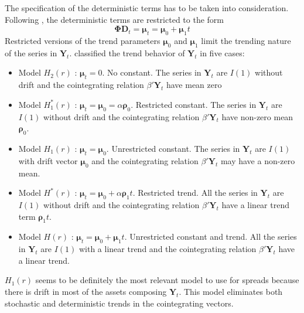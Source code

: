 \documentclass[11pt,a4,twosided,singlespacing,titlepagenumber=on]{scrreprt}
\numberwithin{equation}{chapter} %
\theoremstyle{remark}
\newcommand{\matr}[1]{\mathbf{#1}}
\begin{document}
The specification of the deterministic terms has to be taken into consideration. Following \cite{johansen1995}, the deterministic terms are restricted to the form
\begin{equation}
\matr{\Phi} \matr{D}_t = \matr{\mu}_t = \matr{\mu}_0 + \matr{\mu}_1 t
\end{equation}
Restricted versions of the trend parameters $\matr{\mu}_0$ and $\matr{\mu}_1$ limit the trending nature of the series in $\matr{Y}_t$. \cite{johansen1995} classified the trend behavior of $\matr{Y}_t$ in five cases:
\begin{itemize}
\item Model $H_2(r)$ : $\matr{\mu}_t = 0$. No constant. The series in $\matr{Y}_t$ are $I(1)$ without drift and the cointegrating relation $\beta' \matr{Y}_t$ have mean zero
\item Model $H_1^*(r)$ : $\matr{\mu}_t = \matr{\mu}_0 = \alpha \matr{\rho}_0$. Restricted constant. The series in $\matr{Y}_t$ are $I(1)$ without drift and the cointegrating relation $\beta' \matr{Y}_t$ have non-zero mean $\matr{\rho}_0$.
\item Model $H_1(r)$ : $\matr{\mu}_t = \matr{\mu}_0$. Unrestricted constant. The series in $\matr{Y}_t$ are $I(1)$ with drift vector $\matr{\mu}_0$ and the cointegrating relation $\beta' \matr{Y}_t$ may have a non-zero mean.
\item Model $H^*(r)$ : $\matr{\mu}_t = \matr{\mu}_0 + \alpha \matr{\rho}_1 t$. Restricted trend. All the series in $\matr{Y}_t$ are $I(1)$ without drift and the cointegrating relation $\beta' \matr{Y}_t$ have a linear trend term $\matr{\rho}_1 t$.
\item Model $H(r)$ : $\matr{\mu}_t = \matr{\mu}_0 + \matr{\mu}_1 t$. Unrestricted constant and trend. All the series in $\matr{Y}_t$ are $I(1)$ with a linear trend and the cointegrating relation $\beta' \matr{Y}_t$ have a linear trend.
\end{itemize}
$H_1(r)$ seems to be definitely the most relevant model to use for spreads because there is drift in most of the assets composing $\matr{Y}_t$. This model eliminates both stochastic and deterministic trends in the cointegrating vectors.
\end{document}
